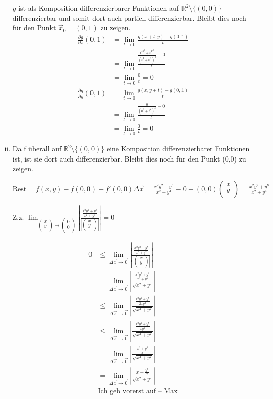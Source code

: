 \documentclass[10pt,a4paper,parskip=half]{scrartcl}
\newcommand{\R}{\mathbb{R}}
\newcommand{\vectwo}[2]{\left(\begin {array} {c} #1 \\ #2 \\ \end {array} \right)}
\begin{document}
\begin{enumerate}[(i)]
$g$ ist als Komposition differenzierbarer Funktionen auf $\R^2\setminus{\{(0,0)\}}$ differenzierbar und somit dort auch partiell differenzierbar. Bleibt dies noch für den Punkt $\vec x_0 = (0,1)$ zu zeigen.
\begin{align*}
\frac{\partial g}{\partial x} (0,1)&= \lim_{t \to 0} \frac{g(x+t,y)-g(0,1)}{t}\\
&= \lim_{t \to 0} \frac{\frac{t^40^2+t^30^3}{(t^2+0^2)^3} - 0}{t}\\
&= \lim_{t \to 0} \frac{0}{t} = 0
\end{align*}
\begin{align*}
\frac{\partial g}{\partial y} (0,1)&= \lim_{t \to 0} \frac{g(x,y+t)-g(0,1)}{t}\\
&= \lim_{t \to 0} \frac{\frac{0}{(0^2+t^2)^3} - 0}{t}\\
&= \lim_{t \to 0} \frac{0}{t} = 0
\end{align*}

\item
Da f überall auf $\mathbb R^2\setminus{\{(0,0)\}}$ eine Komposition differenzierbarer Funktionen ist, ist sie dort auch differenzierbar. Bleibt dies noch für den Punkt (0,0) zu zeigen.

$\text{Rest} = f(x,y) - f(0,0) - f'(0,0) \Delta \vec x = \frac{x^2y^2+y^8}{x^2 + y^4} - 0 - (0,0) \vectwo{x}{y} = \frac{x^2y^2+y^8}{x^2 + y^4}$

Z.z. $\lim_{\vectwo{x}{y} \to \vectwo{0}{0}} \left|\frac{\frac{x^2y^2+y^8}{x^2 + y^4}}{\left|\vectwo{x}{y}\right|}\right| = 0$

\begin{align*}
0 &\le \lim_{\Delta \vec x \to \vec 0} \left|\frac{\frac{x^2y^2+y^8}{x^2 + y^4}}{\left|\vectwo{x}{y}\right|}\right|\\
&= \lim_{\Delta \vec x \to \vec 0} \left|\frac{\frac{x^2y^2+y^8}{x^2 + y^4}}{\sqrt{x^2+y^2}}\right| \\ 
&\le \lim_{\Delta \vec x \to \vec 0} \left|\frac{\frac{x^2y^2+y^8}{2xy^2}}{\sqrt{x^2+y^2}}\right| \\ 
&\le \lim_{\Delta \vec x \to \vec 0} \left|\frac{\frac{x^2y^2+y^8}{xy^2}}{\sqrt{x^2+y^2}}\right| \\ 
&= \lim_{\Delta \vec x \to \vec 0} \left|\frac{\frac{x^2+y^6}{x}}{\sqrt{x^2+y^2}}\right| \\ 
&= \lim_{\Delta \vec x \to \vec 0} \left|\frac{x+\frac{y^6}{x}}{\sqrt{x^2+y^2}}\right| \\ 
& \text{Ich geb vorerst auf -- Max}
\end{align*}


\end{enumerate}
\end{document}
